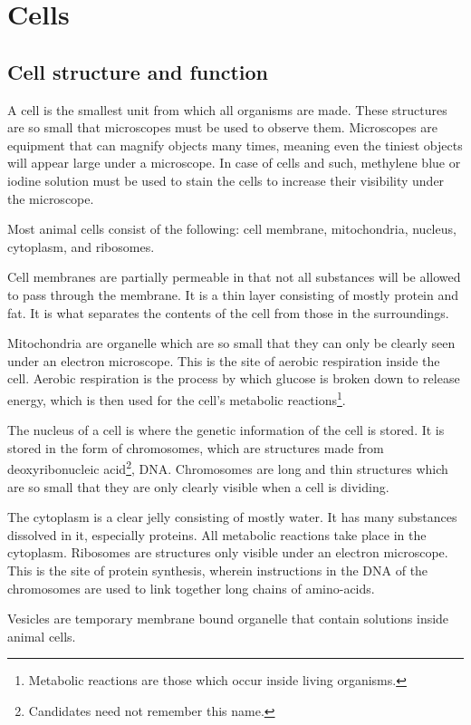 \section{Cells}
\subsection{Cell structure and function}

A cell is the smallest unit from which all organisms are made. These structures are so small
that microscopes must be used to observe them. Microscopes are equipment that can magnify objects
many times, meaning even the tiniest objects will appear large under a microscope. In case of cells
and such, methylene blue or iodine solution must be used to stain the cells to increase their
visibility under the microscope.

Most animal cells consist of the following: cell membrane, mitochondria, nucleus, cytoplasm, and
ribosomes. 

Cell membranes  are partially permeable in that not all substances will be allowed to 
pass through the membrane. It is a thin layer consisting of mostly protein and fat. It is what
separates the contents of the cell from those in the surroundings. 

Mitochondria are organelle which are so small that they can only be clearly seen under an electron
microscope. This is the site of aerobic respiration inside the cell. Aerobic respiration is the
process by which glucose is broken down to release energy, which is then used for the cell's
metabolic reactions\footnote{Metabolic reactions are those which occur inside living organisms.}.

The nucleus of a cell is where the genetic information of the cell is stored. It is stored in
the form of chromosomes, which are structures made from deoxyribonucleic acid\footnote{Candidates
need not remember this name.}, DNA. Chromosomes are long and thin structures which are so small 
that they are only clearly visible when a cell is dividing.

The cytoplasm is a clear jelly consisting of mostly water. It has many substances dissolved in it,
especially proteins. All metabolic reactions take place in the cytoplasm. Ribosomes are structures only visible under an electron microscope. This is the site of protein
synthesis, wherein instructions in the DNA of the chromosomes are used to link together long chains
of amino-acids.

Vesicles are temporary membrane bound organelle that contain solutions inside animal cells.

